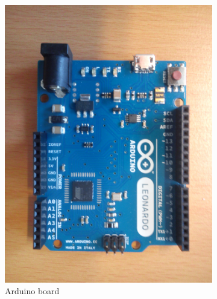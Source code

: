 \documentclass[a4paper,10pt]{article}
\begin{document}
\begin{figure}
    \centering
    \begin{subfigure}[b]{0.32\textwidth}
      \includegraphics[width=\textwidth]{../figures/leo.jpg}
	  \caption{Arduino board}
    \end{subfigure}
    \begin{subfigure}[b]{0.32\textwidth}

\end{subfigure}
\end{figure}
\end{document}
